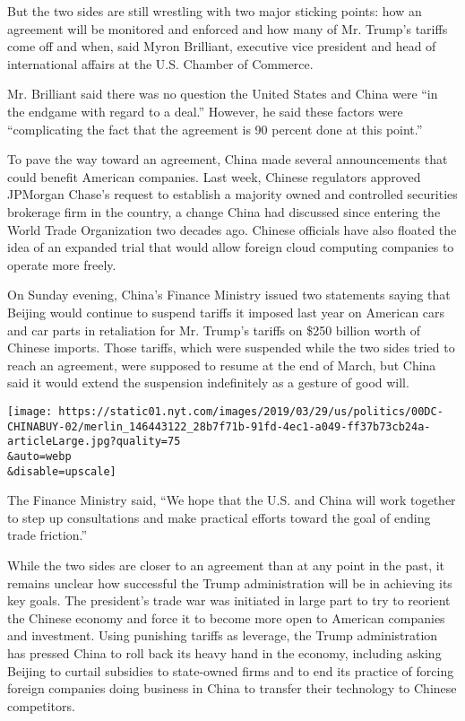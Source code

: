 But the two sides are still wrestling with two major sticking points:
how an agreement will be monitored and enforced and how many of Mr.
Trump's tariffs come off and when, said Myron Brilliant, executive vice
president and head of international affairs at the U.S. Chamber of
Commerce.

Mr. Brilliant said there was no question the United States and China
were ``in the endgame with regard to a deal.'' However, he said these
factors were ``complicating the fact that the agreement is 90 percent
done at this point.''

To pave the way toward an agreement, China made several announcements
that could benefit American companies. Last week, Chinese regulators
approved JPMorgan Chase's request to establish a majority owned and
controlled securities brokerage firm in the country, a change China had
discussed since entering the World Trade Organization two decades ago.
Chinese officials have also floated the idea of an expanded trial that
would allow foreign cloud computing companies to operate more freely.

On Sunday evening, China's Finance Ministry issued two statements saying
that Beijing would continue to suspend tariffs it imposed last year on
American cars and car parts in retaliation for Mr. Trump's tariffs on
\$250 billion worth of Chinese imports. Those tariffs, which were
suspended while the two sides tried to reach an agreement, were supposed
to resume at the end of March, but China said it would extend the
suspension indefinitely as a gesture of good will.

\texttt{[image: https://static01.nyt.com/images/2019/03/29/us/politics/00DC-CHINABUY-02/merlin\_146443122\_28b7f71b-91fd-4ec1-a049-ff37b73cb24a-articleLarge.jpg?quality=75\\\&auto=webp\\\&disable=upscale]}

The Finance Ministry said, ``We hope that the U.S. and China will work
together to step up consultations and make practical efforts toward the
goal of ending trade friction.''

While the two sides are closer to an agreement than at any point in the
past, it remains unclear how successful the Trump administration will be
in achieving its key goals. The president's trade war was initiated in
large part to try to reorient the Chinese economy and force it to become
more open to American companies and investment. Using punishing tariffs
as leverage, the Trump administration has pressed China to roll back its
heavy hand in the economy, including asking Beijing to curtail subsidies
to state-owned firms and to end its practice of forcing foreign
companies doing business in China to transfer their technology to
Chinese competitors.

